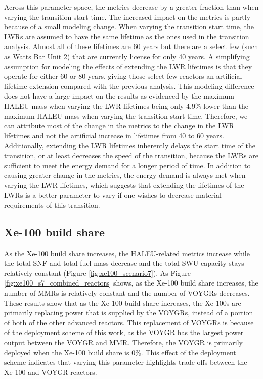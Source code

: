 Across this parameter space, the metrics decrease by a greater fraction than 
when varying the transition start time. The increased impact on the metrics 
is partly because of a small modeling change. When varying the transition 
start time, the \glspl{LWR} are assumed to have the same lifetime as the 
ones used in the transition analysis. Almost all of these lifetimes are  
60 years but there are a select few (such as Watts Bar Unit 2) that 
are currently license for only 40 years. A simplifying assumption for 
modeling the effects of extending the \gls{LWR} lifetimes is that 
they operate for either 60 or 80 years, giving those select few reactors 
an artificial lifetime extension compared with the previous analysis. 
This modeling difference does not have a large impact on the results as 
evidenced by the maximum \gls{HALEU} mass when varying the \gls{LWR} lifetimes 
being only 4.9\% lower than the maximum \gls{HALEU} mass when varying the 
transition start time. Therefore, we can attribute most of the change in
the metrics to the 
change in the \gls{LWR} lifetimes and not the artificial increase in 
lifetimes from 40 to 60 years. Additionally, extending the \gls{LWR}
lifetimes inherently delays the start time of the transition, or at 
least decreases the speed of the transition, because the \glspl{LWR} 
are sufficient to meet the energy demand for a longer period of time.
In addition to causing greater change in the metrics, the energy demand 
is always met when varying the \gls{LWR} lifetimes, which suggests that 
extending the lifetimes of the \glspl{LWR} is a better parameter to vary 
if one wishes to decrease material requirements of this transition. 

\subsection{Xe-100 build share}
As the Xe-100 build share increases, the \gls{HALEU}-related metrics 
increase while the total \gls{SNF} and total fuel mass decrease and the 
total \gls{SWU} capacity stays relatively constant 
(Figure \ref{fig:xe100_scenario7}). As Figure \ref{fig:xe100_s7_combined_reactors} 
shows, as the Xe-100 build share 
increases, the number of \glspl{MMR} is relatively constant and the number of 
VOYGRs decreases. These results show that as the Xe-100 build share 
increases, the Xe-100s are primarily replacing power that is supplied by 
the VOYGRs, instead of a portion of both of the other advanced reactors.
This replacement of VOYGRs is because of the deployment scheme of this
work, as the VOYGR has the largest power output between the VOYGR and 
\gls{MMR}. Therefore, the VOYGR is primarily deployed when the Xe-100 
build share is 0\%. This effect of the deployment scheme indicates that 
varying this parameter highlights trade-offs between the Xe-100 and 
VOYGR reactors.

